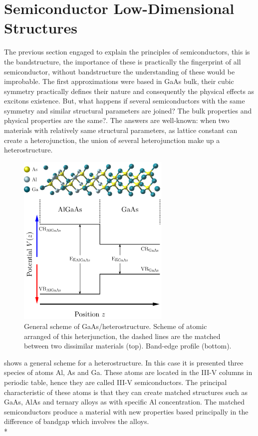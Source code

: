 \section{Semiconductor Low-Dimensional Structures}
\label{sec:chapter-1-low-dimensional-structures}
\vspace{-10mm} 
The previous section engaged to explain the principles of semiconductors, this is the bandstructure, the importance of these is practically the fingerprint of all semiconductor, without bandstructure  the understanding of these would be improbable. The first approximations were based in  GaAs bulk, their cubic symmetry practically defines their nature and consequently the physical effects as excitons existence.  But, what happens  if several semiconductors with the same symmetry and similar structural parameters are joined? The bulk properties and physical properties are the same?. 
The answers  are well-known: when two materials with relatively same structural parameters, as lattice constant can create a heterojunction, the union of several heterojunction make up a heterostructure.\\
\begin{figure}[h]
	\centering
	\includegraphics[width=0.65\textwidth]{../figures/chapter-1/heterostructures/out/hs-01}
	\caption{General scheme of GaAs/\algaas heterostructure. Scheme of atomic arranged of this heterjunction, the dashed lines are the matched between two dissimilar
	materials (top). Band-edge profile (bottom).}
	\label{fig:subsection-1.2-heterostructure}
\end{figure}
 shows  a general scheme for a heterostructure. In this case it is presented three species of atoms Al, As and Ga. These atoms are located in the III-V columns in periodic table, hence they are called III-V semiconductors. The principal characteristic of these atoms is that they can create matched structures such as GaAs, AlAs and ternary alloys as \algaas with specific Al concentration. The matched semiconductors produce a material with new properties based principally in the difference of bandgap which involves the alloys. \\* 

